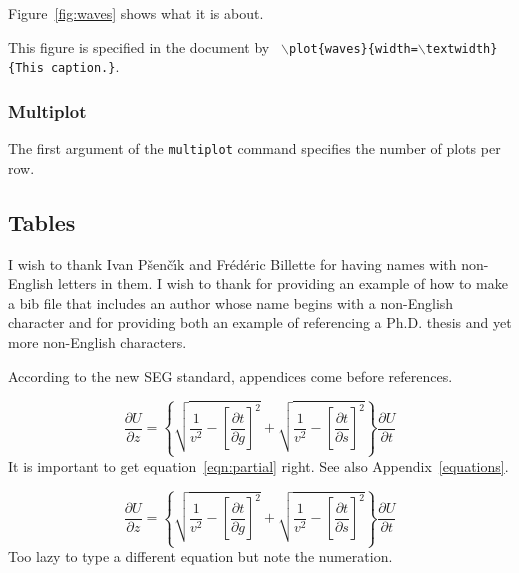 \documentclass[paper,revised]{geophysics}
\begin{document}
Figure~\ref{fig:waves} shows what it is about.

{This figure is specified in the document by \texttt{
    $\backslash$plot\{waves\}\{width=$\backslash$textwidth\}\{This caption.\}}.
}

\subsubsection{Multiplot} 


The first argument of the \texttt{multiplot} command specifies the
number of plots per row.

\subsection{Tables}


\begin{acknowledgments}
I wish to thank Ivan P\v{s}en\v{c}\'{\i}k and Fr\'ed\'eric Billette
for having names with non-English letters in them.  I wish to thank
\cite{Cerveny} for providing an example of how to make a bib file that
includes an author whose name begins with a non-English character and
\cite{forgues96} for providing both an example of referencing a Ph.D.
thesis and yet more non-English characters.
\end{acknowledgments}

\label{example}

According to the new SEG standard, appendices come before references.

\begin{equation}
\frac{\partial U}{\partial z} = 
\left\{
  \sqrt{\frac{1}{v^2} - \left[\frac{\partial t}{\partial g}\right]^2} +
  \sqrt{\frac{1}{v^2} - \left[\frac{\partial t}{\partial s}\right]^2}
\right\}
\frac{\partial U}{\partial t}
\label{eqn:partial}
\end{equation}
It is important to get equation~\ref{eqn:partial} right. See also
Appendix~\ref{equations}.


\begin{equation}
\frac{\partial U}{\partial z} = 
\left\{
  \sqrt{\frac{1}{v^2} - \left[\frac{\partial t}{\partial g}\right]^2} +
  \sqrt{\frac{1}{v^2} - \left[\frac{\partial t}{\partial s}\right]^2}
\right\}
\frac{\partial U}{\partial t}
\label{eqn:partial2}
\end{equation}
Too lazy to type a different equation but note the numeration.
\end{document}
